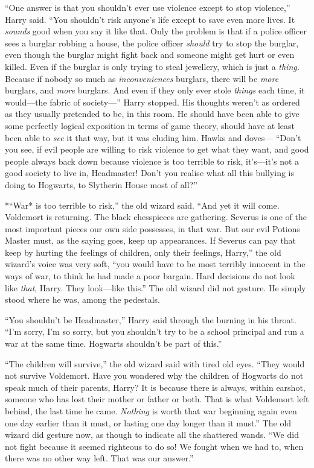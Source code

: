 ``One answer is that you shouldn't ever use violence except to stop
violence,'' Harry said. ``You shouldn't risk anyone's life except to
save even more lives. It \emph{sounds} good when you say it like that.
Only the problem is that if a police officer sees a burglar robbing a
house, the police officer \emph{should} try to stop the burglar, even
though the burglar might fight back and someone might get hurt or even
killed. Even if the burglar is only trying to steal jewellery, which is
just a \emph{thing.} Because if nobody so much as \emph{inconveniences}
burglars, there will be \emph{more} burglars, and \emph{more} burglars.
And even if they only ever stole \emph{things} each time, it would---the
fabric of society---'' Harry stopped. His thoughts weren't as ordered as
they usually pretended to be, in this room. He should have been able to
give some perfectly logical exposition in terms of game theory, should
have at least been able to \emph{see} it that way, but it was eluding
him. Hawks and doves--- ``Don't you see, if evil people are willing to
risk violence to get what they want, and good people always back down
because violence is too terrible to risk, it's---it's not a good society
to live in, Headmaster! Don't you realise what all this bullying is
doing to Hogwarts, to Slytherin House most of all?''

*``War* is too terrible to risk,'' the old wizard said. ``And yet it
will come. Voldemort is returning. The black chesspieces are gathering.
Severus is one of the most important pieces our own side possesses, in
that war. But our evil Potions Master must, as the saying goes, keep up
appearances. If Severus can pay that keep by hurting the feelings of
children, only their feelings, Harry,'' the old wizard's voice was very
soft, ``you would have to be most terribly innocent in the ways of war,
to think he had made a poor bargain. Hard decisions do not look like
\emph{that}, Harry. They look---like this.'' The old wizard did not
gesture. He simply stood where he was, among the pedestals.

``You shouldn't be Headmaster,'' Harry said through the burning in his
throat. ``I'm sorry, I'm so sorry, but you shouldn't try to be a school
principal and run a war at the same time. Hogwarts shouldn't be part of
this.''

``The children will survive,'' the old wizard said with tired old eyes.
``They would not survive Voldemort. Have you wondered why the children
of Hogwarts do not speak much of their parents, Harry? It is because
there is always, within earshot, someone who has lost their mother or
father or both. That is what Voldemort left behind, the last time he
came. \emph{Nothing} is worth that war beginning again even one day
earlier than it must, or lasting one day longer than it must.'' The old
wizard did gesture now, as though to indicate all the shattered wands.
``We did not fight because it seemed righteous to do so! We fought when
we had to, when there was no other way left. That was our answer.''

